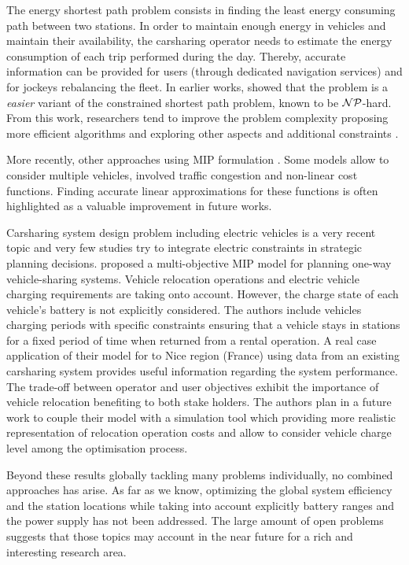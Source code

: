 \begin{bibunit}[ieeetr]
\medskip
The energy shortest path problem consists in finding the least energy consuming path between two stations.
In order to maintain enough energy in vehicles and maintain their availability, the carsharing operator needs to estimate the energy consumption of each trip performed during the day.
Thereby, accurate information can be provided for users (through dedicated navigation services) and for jockeys rebalancing the fleet.
In earlier works, \cite{artmeier_optimal_2010} showed that the problem is a \emph{easier} variant of the constrained shortest path problem, known to be ${\cal NP}$-hard.
From this work, researchers tend to improve the problem complexity proposing more efficient algorithms and exploring other aspects and additional constraints \cite{eisner_optimal_2011, sachenbacher_efficient_2011}.

More recently, other approaches using MIP formulation \cite{touati_combinatorial_2012, wang_energy_2014, arslan_minimum_2015}.
Some models allow to consider multiple vehicles, involved traffic congestion and non-linear cost functions.
Finding accurate linear approximations for these functions is often highlighted as a valuable improvement in future works.


\medskip
Carsharing system design problem including electric vehicles is a very recent topic and very few studies try to integrate electric constraints in strategic planning decisions.
\cite{boyaci_optimization_2015} proposed a multi-objective MIP model for planning one-way vehicle-sharing systems.
Vehicle relocation operations and electric vehicle charging requirements are taking onto account.
However, the charge state of each vehicle's battery is not explicitly considered.
The authors include vehicles charging periods with specific constraints ensuring that a vehicle stays in stations for a fixed period of time when returned from a rental operation.
A real case application of their model for to Nice region (France) using data from an existing carsharing system provides useful information regarding the system performance.
The trade-off between operator and user objectives exhibit the importance of vehicle relocation benefiting to both stake holders.
The authors plan in a future work to couple their model with a simulation tool which providing more realistic representation of relocation operation costs and allow to consider vehicle charge level among the optimisation process.


\medskip
Beyond these results globally tackling many problems individually, no combined approaches has arise. 
As far as we know, optimizing the global system efficiency and the station locations while taking into account explicitly battery ranges and the power supply has not been addressed.
The large amount of open problems suggests that those topics may account in the near future for a rich and interesting  research area.



\end{bibunit}
